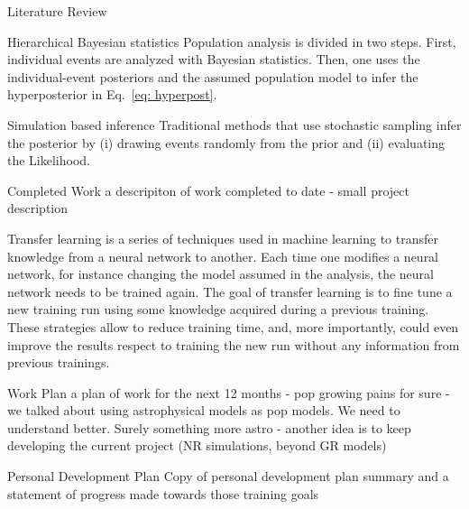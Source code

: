 \documentclass[a4paper, 12pt, twoside, openright, titlepage]{book}
\begin{document}
\begin{chapter}{Literature Review}
\begin{section}{Hierarchical Bayesian statistics}
Population analysis is divided in two steps.
First, individual events are analyzed with Bayesian statistics. 
Then, one uses the individual-event posteriors and the assumed population model to infer the hyperposterior in Eq.~\ref{eq: hyperpost}.







\end{section}

\begin{section}{Simulation based inference}
Traditional methods that use stochastic sampling infer the posterior by (i) drawing events randomly from the prior and (ii) evaluating the Likelihood.
\end{section}















\end{chapter}

\begin{chapter}{Completed Work}
a descripiton of work completed to date
- small project description

Transfer learning is a series of techniques used in machine learning to transfer knowledge from a neural network to another.
Each time one modifies a neural network, for instance changing the model assumed in the analysis, the neural network needs to be trained again. 
The goal of transfer learning is to fine tune a new training run using some knowledge acquired during a previous training.
These strategies allow to reduce training time, and, more importantly, could even improve the results respect to training the new run without any information from previous trainings. 




\end{chapter}

\begin{chapter}{Work Plan}
a plan of work for the next 12 months
- pop growing pains for sure
- we talked about using astrophysical models as pop models. We need to understand better. Surely something more astro
- another idea is to keep developing the current project (NR simulations, beyond GR models)
\end{chapter}

\begin{chapter}{Personal Development Plan}
Copy of personal development plan summary and a statement of progress made towards those training goals
\end{chapter}

\appendix
%
%
%

\backmatter

\end{document}
